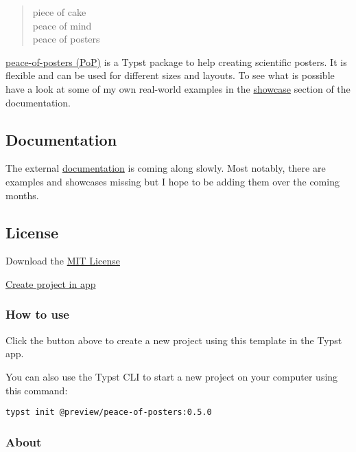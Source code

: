 \begin{quote}
piece of cake\\
peace of mind\\
peace of posters
\end{quote}

\href{https://github.com/jonaspleyer/peace-of-posters}{peace-of-posters
(PoP)} is a Typst package to help creating scientific posters. It is
flexible and can be used for different sizes and layouts. To see what is
possible have a look at some of my own real-world examples in the
\href{https://jonaspleyer.github.io/peace-of-posters/showcase/}{showcase}
section of the documentation.

\subsection{Documentation}\label{documentation}

The external
\href{https://jonaspleyer.github.io/peace-of-posters/}{documentation} is
coming along slowly. Most notably, there are examples and showcases
missing but I hope to be adding them over the coming months.

\subsection{License}\label{license}

Download the \href{https://www.mit.edu/~amini/LICENSE.md}{MIT License}

\href{/app?template=peace-of-posters&version=0.5.0}{Create project in
app}

\subsubsection{How to use}\label{how-to-use}

Click the button above to create a new project using this template in
the Typst app.

You can also use the Typst CLI to start a new project on your computer
using this command:

\begin{verbatim}
typst init @preview/peace-of-posters:0.5.0
\end{verbatim}



\subsubsection{About}\label{about}

